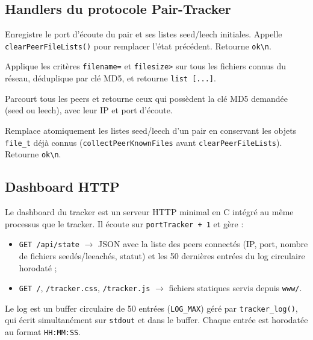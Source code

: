 \documentclass[12pt,a4paper]{article}
\begin{document}
\subsection{Handlers du protocole Pair-Tracker}

\begin{description}[leftmargin=1.2cm]
  \item[\texttt{handleAnnounce}] Enregistre le port d'écoute du pair et ses
        listes seed/leech initiales. Appelle \texttt{clearPeerFileLists()} pour
        remplacer l'état précédent. Retourne \texttt{ok\textbackslash n}.
  \item[\texttt{handleLook}] Applique les critères \texttt{filename=} et
        \texttt{filesize>} sur tous les fichiers connus du réseau, déduplique
        par clé MD5, et retourne \texttt{list [...]}.
  \item[\texttt{handleGetfile}] Parcourt tous les peers et retourne ceux qui
        possèdent la clé MD5 demandée (seed ou leech), avec leur IP et port
        d'écoute.
  \item[\texttt{handleUpdate}] Remplace atomiquement les listes seed/leech d'un
        pair en conservant les objets \texttt{file\_t} déjà connus
        (\texttt{collectPeerKnownFiles} avant \texttt{clearPeerFileLists}).
        Retourne \texttt{ok\textbackslash n}.
\end{description}

\subsection{Dashboard HTTP}

Le dashboard du tracker est un serveur HTTP minimal en C intégré au même
processus que le tracker. Il écoute sur \texttt{portTracker + 1} et gère :

\begin{itemize}[leftmargin=1.2cm]
  \item \texttt{GET /api/state} $\rightarrow$ JSON avec la liste des peers
        connectés (IP, port, nombre de fichiers seedés/leeachés, statut) et les
        50 dernières entrées du log circulaire horodaté ;
  \item \texttt{GET /}, \texttt{/tracker.css}, \texttt{/tracker.js}
        $\rightarrow$ fichiers statiques servis depuis \texttt{www/}.
\end{itemize}

Le log est un buffer circulaire de 50 entrées (\texttt{LOG\_MAX}) géré par
\texttt{tracker\_log()}, qui écrit simultanément sur \texttt{stdout} et dans le
buffer. Chaque entrée est horodatée au format \texttt{HH:MM:SS}.
\end{document}
